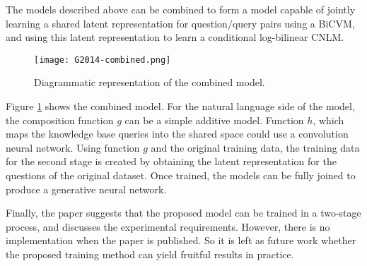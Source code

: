 The models described above can be combined to form a model capable of jointly learning a shared latent representation for question/query pairs using a BiCVM, and using this latent representation to learn a conditional log-bilinear CNLM.

\begin{figure}[h]
  \centering
  \texttt{[image: G2014-combined.png]}\\
  \caption{Diagrammatic representation of the combined model.}\label{fig:G2014-combined}
\end{figure}

Figure \ref{fig:G2014-combined} shows the combined model. For the natural language side of the model, the composition function $g$ can be a simple additive model. Function $h$, which maps the knowledge base queries into the shared space could use a convolution neural network. Using function $g$ and the original training data, the training data for the second stage is created by obtaining the latent representation for the questions of the original dataset. Once trained, the models can be fully joined to produce a generative neural network.

Finally, the paper suggests that the proposed model can be trained in a two-stage process, and discusses the experimental requirements. However, there is no implementation when the paper is published. So it is left as future work whether the proposed training method can yield fruitful results in practice.
